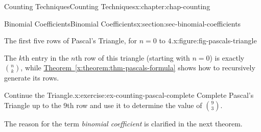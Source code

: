 \documentclass[oneside,10pt,]{book}
\newcommand{\xreffont}{\relax}
\numberwithin{equation}{section}
\newlength{\qrsize}
\newlength{\previewwidth}
\begin{document}
\begin{chapterptx}{Counting Techniques}{}{Counting Techniques}{}{}{x:chapter:chap-counting}
\begin{sectionptx}{Binomial Coefficients}{}{Binomial Coefficients}{}{}{x:section:sec-binomial-coefficients}
\begin{figureptx}{The first five rows of Pascal's Triangle, for \(n = 0\) to \(4\).}{x:figure:fig-pascals-triangle}{}
\begin{image}{0.3}{0.4}{0.3}%
%
\end{image}%
\tcblower
\end{figureptx}%
The \(k\)th entry in the \(n\)th row of this triangle (starting with \(n=0\)) is exactly \(\displaystyle\binom{n}{k}\), while \hyperref[x:theorem:thm-pascals-formula]{Theorem~{\xreffont\ref{x:theorem:thm-pascals-formula}}} shows how to recursively generate its rows.%
\begin{inlineexercise}{Continue the Triangle.}{x:exercise:ex-counting-pascal-complete}%
Complete Pascal's Triangle up to the 9th row and use it to determine the value of \(\displaystyle\binom{9}{3}\).%
\end{inlineexercise}%
The reason for the term \emph{binomial coefficient} is clarified in the next theorem.%
\begin{sidebyside}{1}{0}{0}{0}%
\begin{sbspanel}{1}%
\setlength{\qrsize}{9em}
\setlength{\previewwidth}{\linewidth}
\addtolength{\previewwidth}{-\qrsize}
\begin{tcbraster}[raster columns=2, raster column skip=1pt, raster halign=center, raster force size=false, raster left skip=0pt, raster right skip=0pt]%

\end{tcbraster}
\end{sbspanel}
\end{sidebyside}
\end{sectionptx}
\end{chapterptx}
\end{document}
